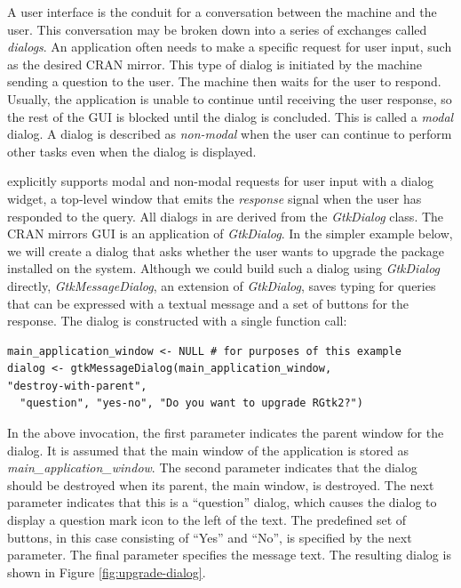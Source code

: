 \documentclass[article]{jss}
\begin{document}
A user interface is the conduit for a conversation between the machine
and the
user. This conversation may be broken down into a series of exchanges
called 
\emph{dialogs}. An application often needs to make a specific request
for user input, such as the desired CRAN mirror. This type of dialog
is 
initiated by the machine sending a question to the user. The machine
then
waits for the user to respond. Usually, the application is unable to
continue
until receiving the user response, so the rest of the GUI is blocked
until
the dialog is concluded. This is called a \emph{modal} dialog.
A dialog is described as \emph{non-modal} when the user can continue
to perform other tasks even when the dialog is displayed.

 explicitly supports modal and non-modal requests for user
input with a dialog widget, a top-level window that emits the
\emph{response} signal when the user has responded to the query. All
dialogs in  are derived from the \emph{GtkDialog} class. The
CRAN mirrors GUI is an application of \emph{GtkDialog}. In the simpler
example below, we will create a dialog that asks whether the user
wants to upgrade the  package installed on the
system. Although we could build such a dialog using \emph{GtkDialog}
directly, \emph{GtkMessageDialog}, an extension of \emph{GtkDialog},
saves typing for queries that can be expressed with a textual message
and a set of buttons for the response. The dialog is constructed with
a single function call:
\begin{verbatim}
main_application_window <- NULL # for purposes of this example
dialog <- gtkMessageDialog(main_application_window,
"destroy-with-parent", 
  "question", "yes-no", "Do you want to upgrade RGtk2?")
\end{verbatim}
In the above invocation, the first parameter indicates the parent
window for
the dialog. It is assumed that the main window of the application is
stored 
as \emph{main\_application\_window}. The second parameter indicates
that
the dialog should be destroyed when its parent, the main window, is
destroyed.
The next parameter indicates that this is a ``question'' dialog, which
causes
the dialog to display a question mark icon to the left of the text.
The 
predefined set of buttons, in this case consisting of ``Yes'' and
``No'', 
is specified by the next parameter. The final parameter specifies the
message text.
The resulting dialog is shown in Figure \ref{fig:upgrade-dialog}.
\end{document}
